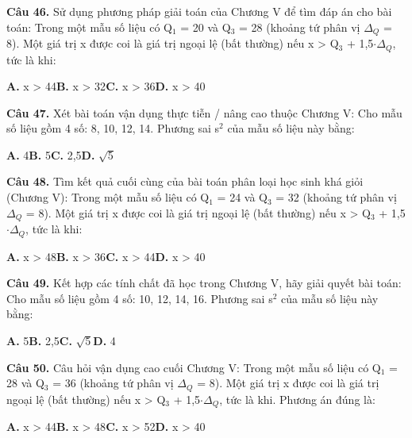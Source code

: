 \documentclass[11pt,a4paper]{article}
\begin{document}
\textbf{\color{primary} Câu 46.} Sử dụng phương pháp giải toán của Chương V để tìm đáp án cho bài toán: Trong một mẫu số liệu có Q$_1$ = 20 và Q$_3$ = 28 (khoảng tứ phân vị $\Delta_Q$ = 8). Một giá trị x được coi là giá trị ngoại lệ (bất thường) nếu x > Q$_3$ + 1,5$\cdot$$\Delta_Q$, tức là khi:\par
\hspace*{1.5em}\textbf{A.} x > 44\quad\quad \textbf{B.} x > 32\quad\quad \textbf{C.} x > 36\quad\quad \textbf{D.} x > 40\par\vspace{2pt}
\textbf{\color{primary} Câu 47.} Xét bài toán vận dụng thực tiễn / nâng cao thuộc Chương V: Cho mẫu số liệu gồm 4 số: 8, 10, 12, 14. Phương sai s$^2$ của mẫu số liệu này bằng:\par
\hspace*{1.5em}\textbf{A.} 4\quad\quad \textbf{B.} 5\quad\quad \textbf{C.} 2,5\quad\quad \textbf{D.} $\sqrt{5}$\par\vspace{2pt}
\textbf{\color{primary} Câu 48.} Tìm kết quả cuối cùng của bài toán phân loại học sinh khá giỏi (Chương V): Trong một mẫu số liệu có Q$_1$ = 24 và Q$_3$ = 32 (khoảng tứ phân vị $\Delta_Q$ = 8). Một giá trị x được coi là giá trị ngoại lệ (bất thường) nếu x > Q$_3$ + 1,5$\cdot$$\Delta_Q$, tức là khi:\par
\hspace*{1.5em}\textbf{A.} x > 48\quad\quad \textbf{B.} x > 36\quad\quad \textbf{C.} x > 44\quad\quad \textbf{D.} x > 40\par\vspace{2pt}
\textbf{\color{primary} Câu 49.} Kết hợp các tính chất đã học trong Chương V, hãy giải quyết bài toán: Cho mẫu số liệu gồm 4 số: 10, 12, 14, 16. Phương sai s$^2$ của mẫu số liệu này bằng:\par
\hspace*{1.5em}\textbf{A.} 5\quad\quad \textbf{B.} 2,5\quad\quad \textbf{C.} $\sqrt{5}$\quad\quad \textbf{D.} 4\par\vspace{2pt}
\textbf{\color{primary} Câu 50.} Câu hỏi vận dụng cao cuối Chương V: Trong một mẫu số liệu có Q$_1$ = 28 và Q$_3$ = 36 (khoảng tứ phân vị $\Delta_Q$ = 8). Một giá trị x được coi là giá trị ngoại lệ (bất thường) nếu x > Q$_3$ + 1,5$\cdot$$\Delta_Q$, tức là khi. Phương án đúng là:\par
\hspace*{1.5em}\textbf{A.} x > 44\quad\quad \textbf{B.} x > 48\quad\quad \textbf{C.} x > 52\quad\quad \textbf{D.} x > 40\par\vspace{2pt}
\end{document}
